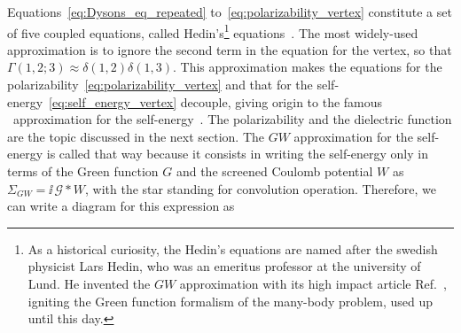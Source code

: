 \noindent Equations~\eqref{eq:Dysons_eq_repeated} to~\eqref{eq:polarizability_vertex} constitute a set of five coupled equations, called Hedin's\footnote{As a historical curiosity, the Hedin's equations are named after the swedish physicist Lars Hedin, who was an emeritus professor at the university of Lund. He invented the $GW$ approximation with its high impact article Ref.~\cite{Hedin_1965}, igniting the Green function formalism of the many-body problem, used up until this day.} equations~\cite{Hedin_1965,Louie_1986}.
The most widely-used approximation is to ignore the second term in the equation for the vertex, so that $\Gamma(1,2;3) \approx \delta(1,2) \delta(1,3)$.
This approximation makes the equations for the polarizability~\eqref{eq:polarizability_vertex} and that for the self-energy~\eqref{eq:self_energy_vertex} decouple, giving origin to the famous \GW~approximation for the self-energy~\cite{Martin_Reining_Ceperley_2016}.%
The polarizability and the dielectric function are the topic discussed in the next section.
The $GW$ approximation for the self-energy is called that way because it consists in writing the self-energy only in terms of the Green function $G$ and the screened Coulomb potential $W$ as $\Sigma_{GW} = \ii \,\mathcal{G} * W$, with the star standing for convolution operation.
Therefore, we can write a diagram for this expression as
\vspace{-0.4cm}

